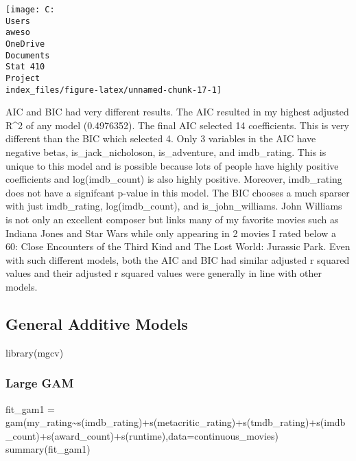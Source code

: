 \documentclass[
]{article}
\newenvironment{Shaded}{\begin{snugshade}}{\end{snugshade}}
\newcommand{\AttributeTok}[1]{\textcolor[rgb]{0.77,0.63,0.00}{#1}}
\newcommand{\FunctionTok}[1]{\textcolor[rgb]{0.00,0.00,0.00}{#1}}
\newcommand{\NormalTok}[1]{#1}
\newcommand{\OtherTok}[1]{\textcolor[rgb]{0.56,0.35,0.01}{#1}}
\newcommand{\SpecialCharTok}[1]{\textcolor[rgb]{0.00,0.00,0.00}{#1}}
\begin{document}
\texttt{[image: C:\\Users\\aweso\\OneDrive\\Documents\\Stat 410\\Project\\index\_files/figure-latex/unnamed-chunk-17-1]}

AIC and BIC had very different results. The AIC resulted in my highest
adjusted R\^{}2 of any model (0.4976352). The final AIC selected 14
coefficients. This is very different than the BIC which selected 4. Only
3 variables in the AIC have negative betas, is\_jack\_nicholoson,
is\_adventure, and imdb\_rating. This is unique to this model and is
possible because lots of people have highly positive coefficients and
log(imdb\_count) is also highly positive. Moreover, imdb\_rating does
not have a signifcant p-value in this model. The BIC chooses a much
sparser with just imdb\_rating, log(imdb\_count), and
is\_john\_williams. John Williams is not only an excellent composer but
links many of my favorite movies such as Indiana Jones and Star Wars
while only appearing in 2 movies I rated below a 60: Close Encounters of
the Third Kind and The Lost World: Jurassic Park. Even with such
different models, both the AIC and BIC had similar adjusted r squared
values and their adjusted r squared values were generally in line with
other models.

\hypertarget{general-additive-models}{%
\subsection{General Additive Models}\label{general-additive-models}}

\begin{Shaded}
\begin{Highlighting}[]
\FunctionTok{library}\NormalTok{(mgcv)}
\end{Highlighting}
\end{Shaded}

\hypertarget{large-gam}{%
\subsubsection{Large GAM}\label{large-gam}}

\begin{Shaded}
\begin{Highlighting}[]
\NormalTok{fit\_gam1 }\OtherTok{=} \FunctionTok{gam}\NormalTok{(my\_rating}\SpecialCharTok{\textasciitilde{}}\FunctionTok{s}\NormalTok{(imdb\_rating)}\SpecialCharTok{+}\FunctionTok{s}\NormalTok{(metacritic\_rating)}\SpecialCharTok{+}\FunctionTok{s}\NormalTok{(tmdb\_rating)}\SpecialCharTok{+}\FunctionTok{s}\NormalTok{(imdb\_count)}\SpecialCharTok{+}\FunctionTok{s}\NormalTok{(award\_count)}\SpecialCharTok{+}\FunctionTok{s}\NormalTok{(runtime),}\AttributeTok{data=}\NormalTok{continuous\_movies)}
\FunctionTok{summary}\NormalTok{(fit\_gam1)}
\end{Highlighting}
\end{Shaded}
\end{document}
